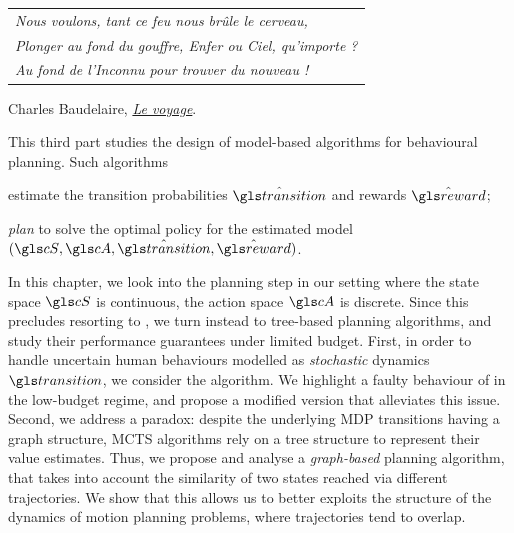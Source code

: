 
\graphicspath{{2-Chapters/6-Chapter/}}

\label{chapter:6}

\begin{flushright}
	\begin{tabular}{@{}l@{}}
		\emph{Nous voulons, tant ce feu nous brûle le cerveau,}\\
		\emph{Plonger au fond du gouffre, Enfer ou Ciel, qu’importe ?}\\
		\emph{Au fond de l’Inconnu pour trouver du nouveau !}\\
	\end{tabular}
	
	Charles Baudelaire, \href{https://eleurent.github.io/sisyphe/texts/le-voyage.html}{\emph{Le voyage}}.
\end{flushright}

\abstractStartChapter{}%

This third part studies the design of model-based algorithms for behavioural planning. Such algorithms \begin{enumerate*}[label=(\roman*)]
	\item estimate the transition probabilities $\hat{\Ps}$ and rewards $\hat{\reward}$;
	\item \emph{plan} to solve the optimal policy for the estimated model $(\cS, \cA, \hat{\Ps}, \hat{\reward})$.
\end{enumerate*}
In this chapter, we look into the planning step in our setting where the state space $\cS$ is continuous, the action space $\cA$ is discrete. Since this precludes resorting to , we turn instead to tree-based planning algorithms, and study their performance guarantees under limited budget. First, in order to handle uncertain human behaviours modelled as \emph{stochastic} dynamics $\Ps$, we consider the \OLOP algorithm. We highlight a faulty behaviour of \OLOP in the low-budget regime, and propose a modified version that alleviates this issue. Second, we address a paradox: despite the underlying \gls{MDP} transitions having a graph structure, \gls{MCTS} algorithms rely on a tree structure to represent their value estimates. Thus, we propose and analyse a \emph{graph-based} planning algorithm, that takes into account the similarity of two states reached via different trajectories. We show that this allows us to better exploits the structure of the dynamics of motion planning problems, where trajectories tend to overlap.
\minitocStartChapter{}

